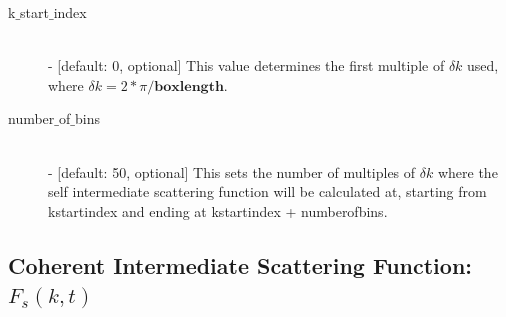 \documentclass{article}
\begin{document}
\begin{description}
	\item[k$\_$start$\_$index] \hfill \\
	- [default: 0, optional] This value determines the first multiple of $\delta k$ used, where $\delta k = 2*\pi/\textbf{boxlength}$.  
	
	\item[number$\_$of$\_$bins] \hfill \\
	- [default: 50, optional] This sets the number of multiples of $\delta k$ where the self intermediate scattering function will be calculated at, starting from kstartindex and ending at kstartindex + numberofbins. 	
	
\end{description}

\subsection{Coherent Intermediate Scattering Function: $F_s(k,t)$} \label{sec::Fqt_parm}
\end{document}
